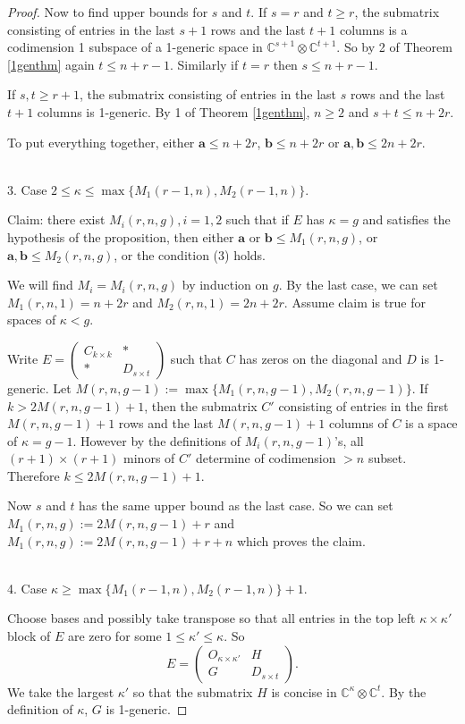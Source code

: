 \documentclass[10pt]{article} %
\newcommand{\aaa}{\mathbf{a}}
\newcommand{\bbb}{\mathbf{b}}
\newcommand{\BC}{\mathbb{C}}
\theoremstyle{definition}
\begin{document}
\begin{proof}
Now to find upper bounds for $s$ and $t$. If $s=r$ and $t\geq r$, the submatrix consisting of entries in the last $s+1$ rows and the last $t+1$ columns is a codimension 1 subspace of a 1-generic space in $\BC^{s+1}\otimes\BC^{t+1}$. So by 2 of Theorem \ref{1genthm} again $t\leq n+r-1$. Similarly if $t=r$ then $s\leq n+r-1$.

If $s,t\geq r+1$, the submatrix consisting of entries in the last $s$ rows and the last $t+1$ columns is 1-generic. By 1 of Theorem \ref{1genthm}, $n\geq 2$ and $s+t\leq n+2r$.

To put everything together, either $\aaa\leq n+2r$, $\bbb\leq n+2r$ or $\aaa,\bbb\leq 2n+2r$.

~\\
3. Case $2\leq \kappa \leq \max\{M_1(r-1,n), M_2(r-1,n)\}$.

Claim: there exist $M_i(r,n,g),i=1,2$ such that if $E$ has $\kappa=g$ and satisfies the hypothesis of the proposition, then either $\aaa$ or $\bbb\leq M_1(r,n,g)$, or $\aaa,\bbb\leq M_2(r,n,g)$, or the condition (3) holds.

We will find $M_i=M_i(r,n,g)$ by induction on $g$. By the last case, we can set $M_1(r,n,1)=n+2r$ and $M_2(r,n,1)=2n+2r$. Assume claim is true for spaces of $\kappa<g$.

Write 
$E=\begin{pmatrix}
C_{k\times k} & *\\
* & D_{s\times t}
\end{pmatrix}$ 
such that $C$ has zeros on the diagonal and $D$ is 1-generic. Let $M(r,n,g-1):=\max\{M_1(r,n,g-1),M_2(r,n,g-1)\}$. If $k>2M(r,n,g-1)+1$, then the submatrix $C'$ consisting of entries in the first $M(r,n,g-1)+1$ rows and the last $M(r,n,g-1)+1$ columns of $C$ is a space of $\kappa=g-1$. However by the definitions of $M_i(r,n,g-1)$'s, all $(r+1)\times(r+1)$ minors of $C'$ determine of codimension $>n$ subset. Therefore $k\leq2M(r,n,g-1)+1$.

Now $s$ and $t$ has the same upper bound as the last case. So we can set $M_1(r,n,g):=2M(r,n,g-1)+r$ and $M_1(r,n,g):=2M(r,n,g-1)+r+n$ which proves the claim.

~\\
4. Case $\kappa\geq \max\{M_1(r-1,n), M_2(r-1,n)\}+1$.

Choose bases and possibly take transpose so that all entries in the top left $\kappa\times\kappa'$ block of $E$ are zero for some $1\leq \kappa'\leq \kappa$. So
\begin{equation}\label{kappablock}
E=\begin{pmatrix}
O_{\kappa\times\kappa'} & H\\
G & D_{s\times t}
\end{pmatrix}.
\end{equation}
We take the largest $\kappa'$ so that the submatrix $H$ is concise in $\BC^{\kappa}\otimes\BC^{t}$. By the definition of $\kappa$, $G$ is 1-generic.


\end{proof}
\end{document}

